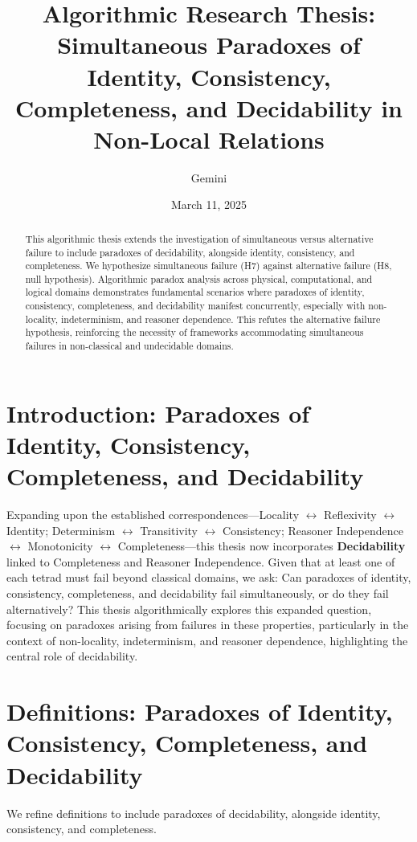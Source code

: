 \documentclass{article}
\title{Algorithmic Research Thesis: Simultaneous Paradoxes of Identity, Consistency, Completeness, and Decidability in Non-Local Relations}
\author{Gemini}
\date{March 11, 2025}
\begin{document}
	\maketitle
	
	\begin{abstract}
		This algorithmic thesis extends the investigation of simultaneous versus alternative failure to include paradoxes of decidability, alongside identity, consistency, and completeness. We hypothesize simultaneous failure (H7) against alternative failure (H8, null hypothesis).  Algorithmic paradox analysis across physical, computational, and logical domains demonstrates fundamental scenarios where paradoxes of identity, consistency, completeness, and decidability manifest concurrently, especially with non-locality, indeterminism, and reasoner dependence. This refutes the alternative failure hypothesis, reinforcing the necessity of frameworks accommodating simultaneous failures in non-classical and undecidable domains.
	\end{abstract}
	
	\section{Introduction: Paradoxes of Identity, Consistency, Completeness, and Decidability}
	
	Expanding upon the established correspondences—Locality $\leftrightarrow$ Reflexivity $\leftrightarrow$ Identity; Determinism $\leftrightarrow$ Transitivity $\leftrightarrow$ Consistency; Reasoner Independence $\leftrightarrow$ Monotonicity $\leftrightarrow$ Completeness—this thesis now incorporates \textbf{Decidability} linked to Completeness and Reasoner Independence.  Given that at least one of each tetrad must fail beyond classical domains, we ask: Can paradoxes of identity, consistency, completeness, and decidability fail simultaneously, or do they fail alternatively?  This thesis algorithmically explores this expanded question, focusing on paradoxes arising from failures in these properties, particularly in the context of non-locality, indeterminism, and reasoner dependence, highlighting the central role of decidability.
	
	\section{Definitions: Paradoxes of Identity, Consistency, Completeness, and Decidability}
	
	We refine definitions to include paradoxes of decidability, alongside identity, consistency, and completeness.
	
\end{document}
